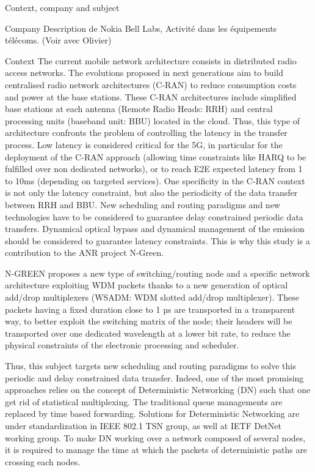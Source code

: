 \documentclass[a4paper,10pt]{report}
\begin{document}
\begin{chapter}{Context, company and subject}
\begin{section}{Company}
 Description de Nokia Bell Labs, Activité dans les équipements télécoms. (Voir avec Olivier)
\end{section}
\begin{section}{Context}
The current mobile network architecture consists in distributed radio access networks.
The evolutions proposed in next generations aim to build centralised radio network architectures (C-RAN) to reduce consumption costs 
and power at the base stations. These C-RAN architectures include simplified base stations at each antenna (Remote Radio Heads: RRH) 
and central processing units (baseband unit: BBU) located in the cloud. Thus, this type of architecture confronts the problem of controlling 
the latency in the transfer process.  Low latency is considered critical for the 5G, in particular for the deployment of the C-RAN approach 
(allowing time constraints like HARQ to be fulfilled over non dedicated networks), or to reach E2E expected latency from 1 to 10ms 
(depending on targeted services). One specificity in the C-RAN context is not only the latency constraint, but also the periodicity of 
the data transfer between RRH and BBU.  New scheduling and routing paradigms and new technologies have to be considered to  guarantee 
delay constrained periodic data transfers. Dynamical optical bypass and dynamical management of the emission should be considered to
guarantee latency constraints. This is why this study is a contribution to the ANR project N-Green.

N-GREEN proposes a new type of switching/routing node and a specific network architecture exploiting WDM packets thanks to a new generation of optical add/drop multiplexers (WSADM: WDM slotted add/drop multiplexer). These packets having a fixed duration close to 1 µs are transported in a transparent way, to better exploit the switching matrix of the node; their headers will be transported over one dedicated wavelength at a lower bit rate, to reduce the physical constraints of the electronic processing and scheduler.

 Thus, this subject targets new scheduling and routing paradigms to solve this periodic and delay constrained data transfer.
 Indeed, one of the most promising approaches relies on the concept of Deterministic Networking (DN) such that one get rid of
 statistical multiplexing. The traditional queue managements are replaced by time based forwarding. Solutions for Deterministic 
 Networking are under standardization in IEEE 802.1 TSN group, as well at IETF DetNet working group.  To make DN working over a
 network composed of several nodes, it is required to manage the time at which the packets of deterministic paths are crossing each nodes. 


\end{section}
\end{chapter}
\end{document}
